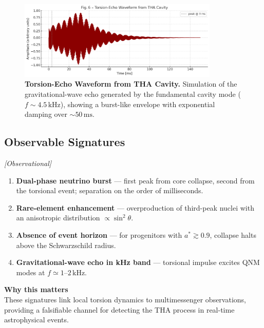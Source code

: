 \documentclass{article}
\newcommand{\obstag}{\textcolor{green!60!black}{\textit{[Observational]}}}
\begin{document}
\begin{figure}[ht!]
\centering
\includegraphics[width=0.85\textwidth]{THF_echo_waveform.png}
\caption{\textbf{Torsion-Echo Waveform from THA Cavity.}
Simulation of the gravitational-wave echo generated by the fundamental cavity mode
($f \sim 4.5\,\mathrm{kHz}$), showing a burst-like envelope with exponential damping
over \(\sim50\,\mathrm{ms}\).}
\label{fig:THF-echo}
\end{figure}



\subsection{Observable Signatures}
\label{subsec:THF-observables}
\obstag

\begin{enumerate}[label=\textbf{\arabic*.}, wide]
  \item \textbf{Dual-phase neutrino burst} --- first peak from core collapse, second from the torsional event; separation on the order of milliseconds.
  \item \textbf{Rare-element enhancement} --- overproduction of third-peak nuclei with an anisotropic distribution $\propto \sin^2\theta$.
  \item \textbf{Absence of event horizon} --- for progenitors with $a^* \gtrsim 0.9$, collapse halts above the Schwarzschild radius.
  \item \textbf{Gravitational-wave echo in kHz band} --- torsional impulse excites QNM modes at $f \simeq 1$--$2\,\text{kHz}$.
\end{enumerate}


\begin{tcolorbox}[
  colback=white,
  colframe=black!30,
  boxrule=0.3pt,
  arc=2pt,
  left=6pt,
  right=6pt,
  top=4pt,
  bottom=4pt,
  enhanced
]
\textbf{Why this matters} \\
\vspace{2pt}
These signatures link local torsion dynamics to multimessenger observations, providing a falsifiable channel for detecting the THA process in real-time astrophysical events.
\end{tcolorbox}
\end{document}
